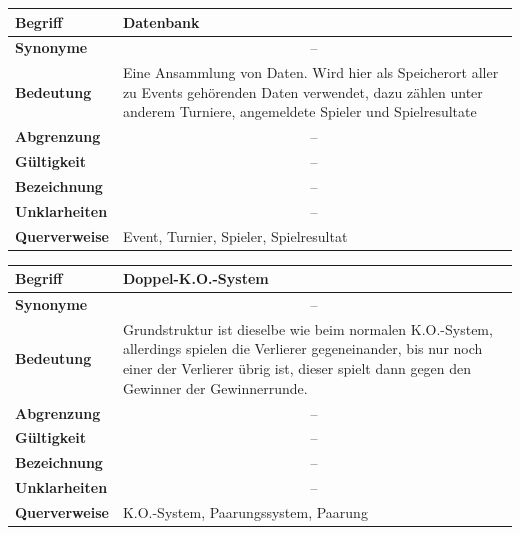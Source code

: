 \documentclass[11pt]{article}
\begin{document}
\newpage

\begin{tabularx}{\textwidth}{| p{} | p{} |}
	\hline
	\textbf{Begriff} & Datenbank\\
	\hline
	\textbf{Synonyme} & \multicolumn{1}{c|}{--} \\
	\hline
	\textbf{Bedeutung} & Eine Ansammlung von Daten. Wird hier als Speicherort aller zu Events gehörenden Daten verwendet, dazu zählen unter anderem Turniere, angemeldete Spieler und Spielresultate\\
	\hline
	\textbf{Abgrenzung} & \multicolumn{1}{c|}{--} \\
	\hline
	\textbf{Gültigkeit} & \multicolumn{1}{c|}{--} \\
	\hline
	\textbf{Bezeichnung} & \multicolumn{1}{c|}{--} \\
	\hline
	\textbf{Unklarheiten} & \multicolumn{1}{c|}{--} \\
	\hline
	\textbf{Querverweise} & Event, Turnier, Spieler, Spielresultat\\
	\hline
\end{tabularx}

\begin{tabularx}{\textwidth}{| p{} | p{} |}
	\hline
	\textbf{Begriff} & Doppel-K.O.-System\\ 
	\hline
	\textbf{Synonyme} & \multicolumn{1}{c|}{--}\\
	\hline 
	\textbf{Bedeutung} & Grundstruktur ist dieselbe wie beim normalen K.O.-System, allerdings spielen die Verlierer gegeneinander, bis nur noch einer der Verlierer übrig ist, dieser spielt dann gegen den Gewinner der Gewinnerrunde.\\
	\hline
	\textbf{Abgrenzung} & \multicolumn{1}{c|}{--}\\
	\hline
	\textbf{Gültigkeit} & \multicolumn{1}{c|}{--}\\
	\hline
	\textbf{Bezeichnung} & \multicolumn{1}{c|}{--}\\
	\hline
	\textbf{Unklarheiten} & \multicolumn{1}{c|}{--} \\
	\hline
	\textbf{Querverweise} & K.O.-System, Paarungssystem, Paarung\\
	\hline
\end{tabularx}
\end{document}
